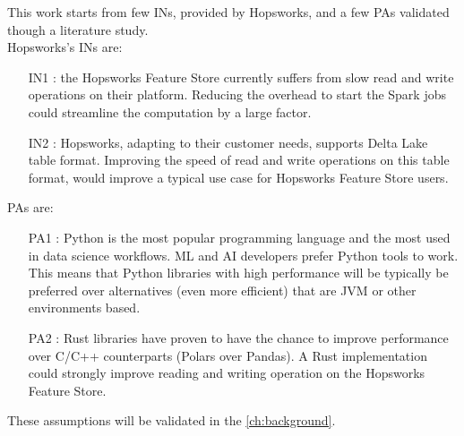 This work starts from few \glspl{IN}, provided by Hopsworks, and a few \glspl{PA} validated though a literature study. \\ Hopsworks's \glspl{IN} are:
\begin{itemize}
    \item[IN1 :] the Hopsworks Feature Store currently suffers from slow read and write operations on their platform. Reducing the overhead to start the Spark jobs could streamline the computation by a large factor.
    \item[IN2 :] Hopsworks, adapting to their customer needs, supports Delta Lake table format. Improving the speed of read and write operations on this table format, would improve a typical use case for Hopsworks Feature Store users.
\end{itemize}
\glspl{PA} are:
\begin{itemize}
    \item[PA1 :] Python is the most popular programming language and the most used in data science workflows. \gls{ML} and \gls{AI} developers prefer Python tools to work. This means that Python libraries with high performance will be typically be preferred over alternatives (even more efficient) that are \gls{JVM} or other environments based.
    \item[PA2 :] Rust libraries have proven to have the chance to improve performance over C/C++ counterparts (Polars over Pandas). A Rust implementation could strongly improve reading and writing operation on the Hopsworks Feature Store.
\end{itemize}
These assumptions will be validated in the \ref{ch:background}. 


